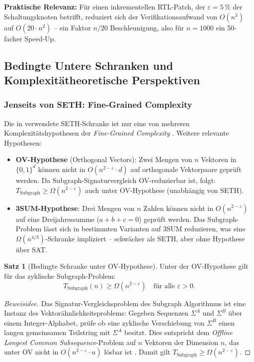 ﻿\documentclass[a4paper,12pt]{article}
\theoremstyle{definition}
\newtheorem{satz}{Satz}
\begin{document}
\textbf{Praktische Relevanz:} Für einen inkrementellen RTL-Patch, der $\varepsilon = 5\,\%$
der Schaltungsknoten betrifft, reduziert sich der Verifikationsaufwand von $O(n^3)$
auf $O(20 \cdot n^2)$ -- ein Faktor $n/20$ Beschleunigung, also für $n = 1000$ ein
50-facher Speed-Up.

\subsection{Bedingte Untere Schranken und Komplexitätheoretische Perspektiven}

\subsubsection{Jenseits von SETH: Fine-Grained Complexity}

Die in \cite{subgraph2026} verwendete SETH-Schranke ist nur eine von mehreren
Komplexitätshypothesen der \emph{Fine-Grained Complexity} \cite{vassilevska2018hardness}.
Weitere relevante Hypothesen:

\begin{itemize}
  \item \textbf{OV-Hypothese} (Orthogonal Vectors): Zwei Mengen von $n$ Vektoren in
        $\{0,1\}^d$ können nicht in $O(n^{2-\varepsilon} \cdot d)$ auf orthogonale
        Vektorpaare geprüft werden. Da Subgraph-Signaturvergleich OV-reduzierbar ist,
        folgt: $T_{\text{Subgraph}} \geq \Omega(n^{2-\varepsilon})$ auch unter OV-Hypothese
        (unabhängig von SETH).
  \item \textbf{3SUM-Hypothese}: Drei Mengen von $n$ Zahlen können nicht in $O(n^{2-\varepsilon})$
        auf eine Dreijahressumme ($a+b+c=0$) geprüft werden. Das Subgraph-Problem lässt
        sich in bestimmten Varianten auf 3SUM reduzieren, was eine $\Omega(n^{4/3})$-Schranke
        impliziert -- schwächer als SETH, aber ohne Hypothese über SAT.
\end{itemize}

\begin{satz}[Bedingte Schranke unter OV-Hypothese]\label{satz:ov_schranke}
  Unter der OV-Hypothese gilt für das zyklische Subgraph-Problem:
  \[
    T_{\text{Subgraph}}(n) \geq \Omega(n^{2-\varepsilon}) \quad \text{für alle } \varepsilon > 0.
  \]
\end{satz}

\begin{proof}[Beweisidee]
  Das Signatur-Vergleichsproblem des Subgraph Algorithmus ist eine Instanz des
  Vektorähnlichkeitsproblems: Gegeben Sequenzen $\Sigma^A$ und $\Sigma^B$ über
  einem Integer-Alphabet, prüfe ob eine zyklische Verschiebung von $\Sigma^B$ einen
  langen gemeinsamen Teilstring mit $\Sigma^A$ besitzt. Dies entspricht dem
  \emph{Offline Longest Common Subsequence}-Problem auf $n$ Vektoren der Dimension $n$,
  das unter OV nicht in $O(n^{2-\varepsilon} \cdot n)$ lösbar ist
  \cite{abboud2014consequences}. Damit gilt $T_{\text{Subgraph}} \geq \Omega(n^{2-\varepsilon})$.
\end{proof}
\end{document}

